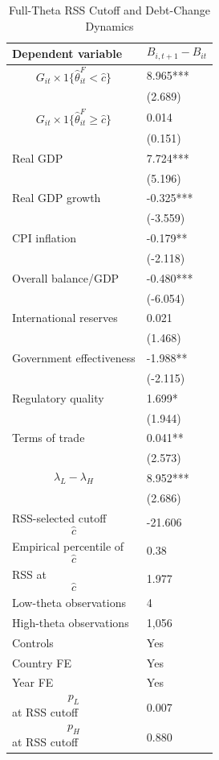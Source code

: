 \begin{table}[H]\centering
\begin{threeparttable}
\caption{Full-Theta RSS Cutoff and Debt-Change Dynamics}
\label{tab:deltaB_rss_cutoff_fulltheta}
\scriptsize
\begin{tabularx}{\textwidth}{lY}
\toprule
Dependent variable & $$B_{i,t+1}-B_{it}$$ \\
\midrule
$$G_{it}\times 1\{\widehat{\theta}^{F}_{it}<\widehat{c}\}$$ & 8.965*** \\
 & (2.689) \\
$$G_{it}\times 1\{\widehat{\theta}^{F}_{it}\geq\widehat{c}\}$$ & 0.014 \\
 & (0.151) \\
Real GDP & 7.724*** \\
 & (5.196) \\
Real GDP growth & -0.325*** \\
 & (-3.559) \\
CPI inflation & -0.179** \\
 & (-2.118) \\
Overall balance/GDP & -0.480*** \\
 & (-6.054) \\
International reserves & 0.021 \\
 & (1.468) \\
Government effectiveness & -1.988** \\
 & (-2.115) \\
Regulatory quality & 1.699* \\
 & (1.944) \\
Terms of trade & 0.041** \\
 & (2.573) \\
$$\lambda_L-\lambda_H$$ & 8.952*** \\
 & (2.686) \\
\midrule
RSS-selected cutoff $$\widehat{c}$$ & -21.606 \\
Empirical percentile of $$\widehat{c}$$ & 0.38 \\
RSS at $$\widehat{c}$$ & 1.977 \\
Low-theta observations & 4 \\
High-theta observations & 1,056 \\
Controls & Yes \\
Country FE & Yes \\
Year FE & Yes \\
$$p_L$$ at RSS cutoff & 0.007 \\
$$p_H$$ at RSS cutoff & 0.880 \\

\end{tabularx}
\end{threeparttable}
\end{table}
